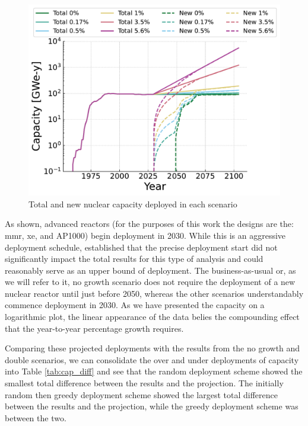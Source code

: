 \begin{figure}[H]
    \centering
    \includegraphics[scale=0.7]{images/results/deployment_calcs/total_new_capacity_scenarios.pdf}
    \caption{Total and new nuclear capacity deployed in each scenario}
    \label{fig:dep_goals}
\end{figure}

As shown, advanced reactors (for the purposes of this work the designs are the:
\gls{mmr}, \gls{xe}, and AP1000) begin deployment in 2030. While this is an
aggressive deployment schedule, \cite{bachmann_thesis_2023} established that
the precise deployment start did not significantly impact the total results for
this type of analysis and could reasonably serve as an upper bound of
deployment. The business-as-usual or, as we will refer to it, no growth
scenario does not require the deployment of a new nuclear reactor until just
before 2050, whereas the other scenarios understandably commence deployment in
2030. As we have presented the capacity on a logarithmic plot, the linear
appearance of the data belies the compounding effect that the year-to-year
percentage growth requires.

Comparing these projected deployments with the results from the no growth and double scenarios, we can consolidate the over and under deployments of capacity into Table \ref{tab:cap_diff} and see that the random deployment scheme showed the smallest total difference between the results and the projection. The initially random then greedy deployment scheme showed the largest total difference between the results and the projection, while the greedy deployment scheme was between the two.

